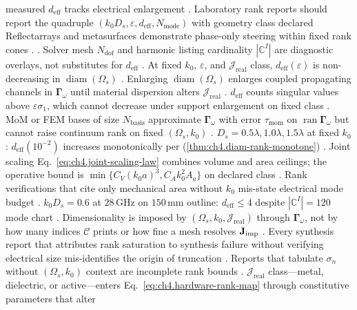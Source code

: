 measured \(d_{\mathrm{eff}}\) tracks electrical enlargement \cite{jackson1999}.
Laboratory rank reports should report the quadruple \((k_{0}D_{s},\varepsilon,d_{\mathrm{eff}},N_{\mathrm{mode}})\) with geometry class declared
Reflectarrays and metasurfaces demonstrate phase-only steering within fixed rank cones \cite{harrington2001}.
\cite{stratton1941}. Solver mesh \(N_{\mathrm{dof}}\) and harmonic listing cardinality \(|\mathbb{C}^{I}|\) are diagnostic overlays,
not substitutes for \(d_{\mathrm{eff}}\) \cite{devaney2004}.
\label{thm:ch4.diam-rank-monotone}
At fixed \(k_{0}\), \(\varepsilon\), and \(\mathcal{J}_{\mathrm{real}}\) class, \(d_{\mathrm{eff}}(\varepsilon)\) is non-decreasing in \(\operatorname{diam}(\Omega_{s})\)
\cite{stratton1941}.
Enlarging \(\operatorname{diam}(\Omega_{s})\) enlarges coupled propagating channels in \(\boldsymbol{\Gamma}_\omega\) until material dispersion alters
\(\mathcal{J}_{\mathrm{real}}\) \cite{harrington2001}. \(d_{\mathrm{eff}}\) counts singular values above \(\varepsilon\sigma_{1}\), which cannot
decrease under support enlargement on fixed class \cite{hansen1988}.
MoM or FEM bases of size \(N_{\mathrm{basis}}\) approximate \(\boldsymbol{\Gamma}_\omega\) with error \(\tau_{\mathrm{mom}}\) on \(\operatorname{ran}\boldsymbol{\Gamma}_\omega\)
but cannot raise continuum rank on fixed \((\Omega_{s},k_{0})\) \cite{harrington2001}. 
\(D_{s}=0.5\lambda,1.0\lambda,1.5\lambda\) at fixed \(k_{0}\): \(d_{\mathrm{eff}}(10^{-2})\) increases monotonically per (\ref{thm:ch4.diam-rank-monotone})
\cite{stratton1941}.
Joint scaling Eq.~\eqref{eq:ch4.joint-scaling-law} combines volume and area ceilings; the operative bound is
\(\min\{C_{V}(k_{0}a)^{3},C_{A}k_{0}^{2}A_{a}\}\) on declared class \cite{stratton1941}.
Rank verifications that cite only mechanical area without \(k_{0}\) mis-state electrical mode budget \cite{stratton1941}.
\(k_{0}D_{s}=0.6\) at \(28\,\mathrm{GHz}\) on \(150\,\mathrm{mm}\) outline: \(d_{\mathrm{eff}}\le4\) despite \(|\mathbb{C}^{I}|=120\) mode chart
\cite{stratton1941}.
Dimensionality is imposed by \((\Omega_{s},k_{0},\mathcal{J}_{\mathrm{real}})\) through \(\boldsymbol{\Gamma}_\omega\), not by how many indices \(\mathcal{C}\)
prints or how fine a mesh resolves \(\mathbf{J}_{\mathrm{imp}}\) \cite{stratton1941}. Every synthesis report that attributes
rank saturation to synthesis failure without verifying electrical size mis-identifies the origin of truncation \cite{collin2001}.
 Reports that
tabulate \(\sigma_{n}\) without \((\Omega_{s},k_{0})\) context are incomplete rank bounds \cite{stratton1941}.
\(\mathcal{J}_{\mathrm{real}}\) class---metal, dielectric, or active---enters Eq.~\eqref{eq:ch4.hardware-rank-map} through constitutive parameters that alter
